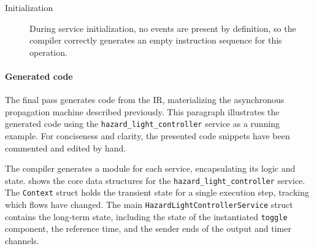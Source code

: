 \begin{enumerate}
\begin{description}
              \item[Initialization]
                    During service initialization, no events are present by definition, so the
                    compiler correctly generates an empty instruction sequence for this operation.
          \end{description}
\end{enumerate}

\paragraph{Generated \Rust code}
The final pass generates \Rust code from the IR, materializing the asynchronous
propagation machine described previously. This paragraph illustrates the generated code
using the \texttt{hazard\_light\_controller} service as a running example. For conciseness
and clarity, the presented code snippets have been commented and edited by hand.

The compiler generates a \Rust module for each service, encapsulating its logic and state.
 shows the core data structures for the
\texttt{hazard\_light\_controller} service.
%
The \texttt{Context} struct holds the transient state for a single execution step,
tracking which flows have changed. The main \texttt{HazardLightControllerService} struct
contains the long-term state, including the state of the instantiated \texttt{toggle}
component, the reference time, and the sender ends of the output and timer channels.

